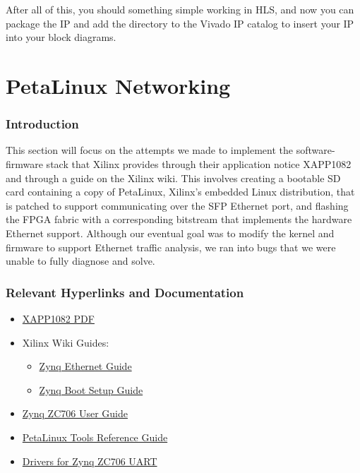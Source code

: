 \documentclass[12pt]{report}
\begin{document}
After all of this, you should something simple working in HLS, and now you can package the IP and add the directory to the Vivado IP catalog to insert your IP into your block diagrams.

\chapter{PetaLinux Networking}
\subsection{Introduction}
This section will focus on the attempts we made to implement the software-firmware stack that Xilinx provides through their application notice XAPP1082 and through a guide on the Xilinx wiki. This involves creating a bootable SD card containing a copy of PetaLinux, Xilinx's embedded Linux distribution, that is patched to support communicating over the SFP Ethernet port, and flashing the FPGA fabric with a corresponding bitstream that implements the hardware Ethernet support. Although our eventual goal was to modify the kernel and firmware to support Ethernet traffic analysis, we ran into bugs that we were unable to fully diagnose and solve.
\subsection{Relevant Hyperlinks and Documentation}
\begin{itemize}
  \item \href{http://www.xilinx.com/support/documentation/application_notes/xapp1082-zynq-eth.pdf}{XAPP1082 PDF}
  \item Xilinx Wiki Guides:
    \begin{itemize}
    \item \href{http://www.wiki.xilinx.com/Zynq+PL+Ethernet}{Zynq Ethernet Guide}
    \item \href{http://www.wiki.xilinx.com/Prepare+Boot+Medium}{Zynq Boot Setup Guide}
    \end{itemize}
  \item \href{http://www.xilinx.com/support/documentation/boards_and_kits/zc706/ug954-zc706-eval-board-xc7z045-ap-soc.pdf}{Zynq ZC706 User Guide}
  \item \href{http://www.xilinx.com/support/documentation/sw_manuals/petalinux2014_4/ug1144-petalinux-tools-reference-guide.pdf}{PetaLinux Tools Reference Guide}
  \item \href{http://www.silabs.com/products/mcu/Pages/USBtoUARTBridgeVCPDrivers.aspx}{Drivers for Zynq ZC706 UART}
\end{itemize}
\end{document}
